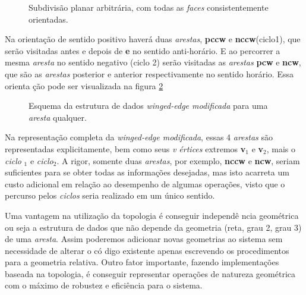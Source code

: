 \documentclass[12pt,a4paper]{book}
\begin{document}
\begin{figure}[htbp]
  \begin{center}
    \leavevmode
    
    \caption{Subdivis\~{a}o planar arbitr\'{a}ria, com todas as {\textit{faces}} 
	               consistentemente orientadas.}   
    \label{fig8_chapter3}
  \end{center}
\end{figure}

Na orienta\c{c}\~{a}o de sentido positivo haver\'{a} duas \textit{arestas}, 
\textbf{pccw} e \textbf{nccw}(ciclo1), que ser\~{a}o visitadas antes e
depois de \textbf{e} no sentido anti-hor\'{a}rio. E ao percorrer a mesma 
\textit{aresta} no sentido negativo (ciclo 2) ser\~{a}o visitadas as \textit{%
arestas} \textbf{pcw} e \textbf{ncw}, que s\~{a}o as \textit{arestas}
posterior e anterior respectivamente no sentido hor\'{a}rio. Essa orienta%
\c{c}\~{a}o pode ser visualizada na figura \ref{fig9_chapter3}

\begin{figure}[htbp]
  \begin{center}
    \leavevmode
    
    \caption{Esquema da estrutura de dados {\textit{winged-edge modificada}} para uma \textit{aresta} qualquer.}   
    \label{fig9_chapter3}
  \end{center}
\end{figure}

Na representa\c{c}\~{a}o completa da \textit{winged-edge modificada}, essas 4 
\textit{arestas} s\~{a}o representadas explicitamente, bem como seus \textit{v%
\'{e}rtices} extremos \textbf{v}$_{1}$ e \textbf{v}$_{2}$, mais o \textit{ciclo%
}$_{1}$ e \textit{ciclo}$_{2}$. A rigor, somente duas \textit{arestas}, por
exemplo, \textbf{nccw} e \textbf{ncw}, seriam suficientes para se obter
todas as informa\c{c}\~{o}es desejadas, mas isto acarreta um custo adicional
em rela\c{c}\~{a}o ao desempenho de algumas opera\c{c}\~{o}es, visto que o
percurso pelos \textit{ciclos} seria realizado em um \'{u}nico sentido.

Uma vantagem na utiliza\c{c}\~{a}o da topologia \'{e} conseguir independ\^{e}%
ncia geom\'{e}trica ou seja a estrutura de dados que n\~{a}o depende da
geometria (reta, grau 2, grau 3) de uma \textit{aresta}. Assim poderemos
adicionar novas geometrias ao sistema sem necessidade de alterar o c\'{o}%
digo existente apenas escrevendo os procedimentos para a geometria relativa.
Outro fator importante, fazendo implementa\c{c}\~{o}es baseada na topologia,
\'{e} conseguir representar opera\c{c}\~{o}es de natureza geom\'{e}trica
com o m\'{a}ximo de robustez e efici\^{e}ncia para o sistema.
\end{document}
